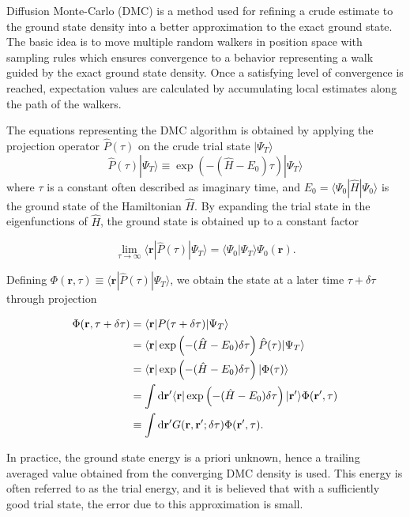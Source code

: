 \documentclass[amsmath, amssymb, aps, floatfix, nofootinbib, preprintnumbers,showpacs, superscriptaddress, twocolumn]{revtex4-1}
\newcommand{\D}{\operatorname{d\!}}
\newcommand{\ket}[1]{| #1 \rangle}
\newcommand{\bra}[1]{\langle #1 |}
\newcommand{\braket}[2]{\langle #1 | #2\rangle}
\begin{document}
Diffusion Monte-Carlo (DMC) is a method used for refining a crude estimate to the ground state density into a better approximation to the exact ground state. The basic idea is to move multiple random walkers in position space with sampling rules which ensures convergence to a behavior representing a walk guided by the exact ground state density. Once a satisfying level of convergence is reached, expectation values are calculated by accumulating local estimates along the path of the walkers.

The equations representing the DMC algorithm is obtained by applying the projection operator $\hat{P}(\tau)$ on the crude trial state $\ket{\Psi_T}$
\begin{equation}
 \hat{P}(\tau)\ket{\Psi_T} \equiv \exp\left({-(\hat{H} - E_0)\tau}\right)\ket{\Psi_T}
\end{equation}
\noindent
where $\tau$ is a constant often described as imaginary time, and $E_0=\bra{\Psi_0}\hat{H}\ket{\Psi_0}$ is the ground state of the Hamiltonian $\hat{H}$. By expanding the trial state in the eigenfunctions of $\hat{H}$, the ground state is obtained up to a constant factor

\begin{equation}
 \label{eq:DMC_ExactProjection}
 \lim_{\tau\to\infty} \bra{\mathbf{r}}  \hat{P}(\tau) \ket{\Psi_T} = \braket{\Psi_0}{\Psi_T}\Psi_0(\mathbf{r}).
\end{equation}

Defining $\Phi(\mathbf{r}, \tau) \equiv \bra{\mathbf{r}}\hat{P}(\tau)\ket{\Psi_T}$, we obtain the state at a later time $\tau + \delta\tau$ through projection

\begin{align}
 \Phi(\mathbf{r}, \tau + \delta\tau) &= \bra{\mathbf{r}} P(\tau + \delta\tau) \ket{\Psi_T} \notag\\
 &= \bra{\mathbf{r}} \exp\left({-(\hat{H} - E_0)\delta\tau}\right) \hat{P}(\tau) \ket{\Psi_T} \notag\\
 &= \bra{\mathbf{r}} \exp\left({-(\hat{H} - E_0)\delta\tau}\right) \ket{\Phi(\tau)} \notag\\
 &= \int \D\mathbf{r}' \bra{\mathbf{r}} \exp\left({-(\hat{H} - E_0)\delta\tau}\right)\ket{\mathbf{r}'} \Phi(\mathbf{r}', \tau)\notag \\
 &\equiv \int \D\mathbf{r}' G(\mathbf{r}, \mathbf{r}'; \delta\tau) \Phi(\mathbf{r}', \tau). \label{eq:DMC_GreenFuncRevealed}
\end{align}

In practice, the ground state energy is a priori unknown, hence a trailing averaged value obtained from the converging DMC density is used. This energy is often referred to as the trial energy, and it is believed that with a sufficiently good trial state, the error due to this approximation is small.
\end{document}
